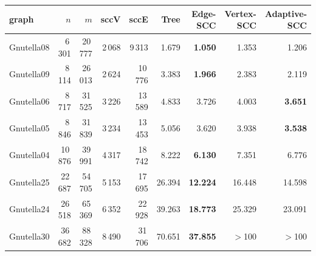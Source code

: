 \begin{tabular}{lrrrr|rrrr}
\toprule
graph & $n$ & $m$ & sccV & sccE & Tree & Edge-SCC & Vertex-SCC & Adaptive-SCC \\
\midrule
Gnutella08 & 6\,301 & 20\,777 & 2\,068 & 9\,313 & 1.679 & \textbf{1.050} & 1.353 & 1.206 \\
Gnutella09 & 8\,114 & 26\,013 & 2\,624 & 10\,776 & 3.383 & \textbf{1.966} & 2.383 & 2.119 \\
Gnutella06 & 8\,717 & 31\,525 & 3\,226 & 13\,589 & 4.833 & 3.726 & 4.003 & \textbf{3.651} \\
Gnutella05 & 8\,846 & 31\,839 & 3\,234 & 13\,453 & 5.056 & 3.620 & 3.938 & \textbf{3.538} \\
Gnutella04 & 10\,876 & 39\,991 & 4\,317 & 18\,742 & 8.222 & \textbf{6.130} & 7.351 & 6.776 \\
Gnutella25 & 22\,687 & 54\,705 & 5\,153 & 17\,695 & 26.394 & \textbf{12.224} & 16.448 & 14.598 \\
Gnutella24 & 26\,518 & 65\,369 & 6\,352 & 22\,928 & 39.263 & \textbf{18.773} & 25.329 & 23.091 \\
Gnutella30 & 36\,682 & 88\,328 & 8\,490 & 31\,706 & 70.651 & \textbf{37.855} & $>$100 & $>$100 \\
\bottomrule
\end{tabular}
